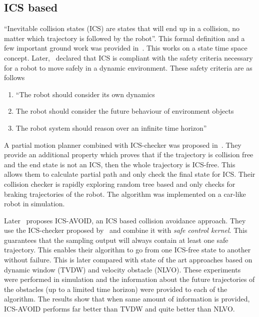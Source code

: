 \subsection{ICS based}%
\label{sub:ics_based}

``Inevitable collision states (ICS) are states that will end up in a collision, no matter which trajectory is followed by the robot''\cite{fraichard2004inevitable}. This formal definition and a few important ground work was provided in~\cite{fraichard2004inevitable}. This works on a state time space concept. Later,~\cite{fraichard2007short} declared that ICS is compliant with the safety criteria necessary for a robot to move safely in a dynamic environment. 
These safety criteria are as follows
    \begin{enumerate}
        \item ``The robot should consider its own dynamics
        \item The robot should consider the future behaviour of environment objects
        \item The robot system should reason over an infinite time horizon''\cite{fraichard2007short}
    \end{enumerate}
A partial motion planner combined with ICS-checker was proposed in~\cite{petti2005safe}. They provide an additional property which proves that if the trajectory is collision free and the end state is not an ICS, then the whole trajectory is ICS-free. This allows them to calculate partial path and only check the final state for ICS\@. Their collision checker is rapidly exploring random tree based and only checks for braking trajectories of the robot. The algorithm was implemented on a car-like robot in simulation.

Later~\cite{martinez2009collision} proposes ICS-AVOID, an ICS based collision avoidance approach. They use the ICS-checker proposed by~\cite{martinez2008efficient} and combine it with \textit{safe control kernel}. This guarantees that the sampling output will always contain at least one safe trajectory. This enables their algorithm to go from one ICS-free state to another without failure. This is later compared with state of the art approaches based on dynamic window (TVDW\cite{seder2007dynamic}) and velocity obstacle (NLVO\cite{large2005navigation}). These experiments were performed in simulation and the information about the future trajectories of the obstacles (up to a limited time horizon) were provided to each of the algorithm. The results show that when same amount of information is provided, ICS-AVOID performs far better than TVDW and quite better than NLVO\@.

